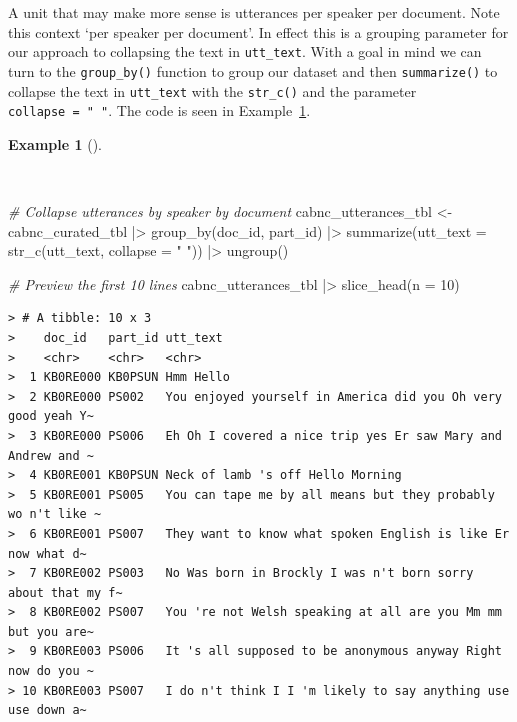\documentclass[
  letterpaper,
  DIV=11,
  numbers=noendperiod]{scrreport}
\newenvironment{Shaded}{\begin{snugshade}}{\end{snugshade}}
\newcommand{\AttributeTok}[1]{\textcolor[rgb]{0.00,0.00,0.00}{#1}}
\newcommand{\CommentTok}[1]{\textcolor[rgb]{0.00,0.00,0.00}{\textit{#1}}}
\newcommand{\DecValTok}[1]{\textcolor[rgb]{0.00,0.00,0.00}{#1}}
\newcommand{\FunctionTok}[1]{\textcolor[rgb]{0.00,0.00,0.00}{#1}}
\newcommand{\NormalTok}[1]{\textcolor[rgb]{0.00,0.00,0.00}{#1}}
\newcommand{\OtherTok}[1]{\textcolor[rgb]{0.00,0.00,0.00}{#1}}
\newcommand{\SpecialCharTok}[1]{\textcolor[rgb]{0.00,0.00,0.00}{#1}}
\newcommand{\StringTok}[1]{\textcolor[rgb]{0.00,0.00,0.00}{#1}}
\theoremstyle{definition}
\newtheorem{example}{Example}[chapter]
\theoremstyle{remark}
\begin{document}
A unit that may make more sense is utterances per speaker per document.
Note this context `per speaker per document'. In effect this is a
grouping parameter for our approach to collapsing the text in
\texttt{utt\_text}. With a goal in mind we can turn to the
\texttt{group\_by()} function to group our dataset and then
\texttt{summarize()} to collapse the text in \texttt{utt\_text} with the
\texttt{str\_c()} and the parameter \texttt{collapse\ =\ "\ "}. The code
is seen in Example~\ref{exm-td-cabnc-tokenization-utterances}.

\begin{example}[]\protect\hypertarget{exm-td-cabnc-tokenization-utterances}{}\label{exm-td-cabnc-tokenization-utterances}

~

\begin{Shaded}
\begin{Highlighting}[]
\CommentTok{\# Collapse utterances by speaker by document}
\NormalTok{cabnc\_utterances\_tbl }\OtherTok{\textless{}{-}} 
\NormalTok{  cabnc\_curated\_tbl }\SpecialCharTok{|\textgreater{}}
  \FunctionTok{group\_by}\NormalTok{(doc\_id, part\_id) }\SpecialCharTok{|\textgreater{}}
  \FunctionTok{summarize}\NormalTok{(}\AttributeTok{utt\_text =} \FunctionTok{str\_c}\NormalTok{(utt\_text, }\AttributeTok{collapse =} \StringTok{" "}\NormalTok{)) }\SpecialCharTok{|\textgreater{}} 
  \FunctionTok{ungroup}\NormalTok{()}

\CommentTok{\# Preview the first 10 lines}
\NormalTok{cabnc\_utterances\_tbl }\SpecialCharTok{|\textgreater{}}
  \FunctionTok{slice\_head}\NormalTok{(}\AttributeTok{n =} \DecValTok{10}\NormalTok{)}
\end{Highlighting}
\end{Shaded}

\begin{verbatim}
> # A tibble: 10 x 3
>    doc_id   part_id utt_text                                                    
>    <chr>    <chr>   <chr>                                                       
>  1 KB0RE000 KB0PSUN Hmm Hello                                                   
>  2 KB0RE000 PS002   You enjoyed yourself in America did you Oh very good yeah Y~
>  3 KB0RE000 PS006   Eh Oh I covered a nice trip yes Er saw Mary and Andrew and ~
>  4 KB0RE001 KB0PSUN Neck of lamb 's off Hello Morning                           
>  5 KB0RE001 PS005   You can tape me by all means but they probably wo n't like ~
>  6 KB0RE001 PS007   They want to know what spoken English is like Er now what d~
>  7 KB0RE002 PS003   No Was born in Brockly I was n't born sorry about that my f~
>  8 KB0RE002 PS007   You 're not Welsh speaking at all are you Mm mm but you are~
>  9 KB0RE003 PS006   It 's all supposed to be anonymous anyway Right now do you ~
> 10 KB0RE003 PS007   I do n't think I I 'm likely to say anything use use down a~
\end{verbatim}

\end{example}
\end{document}
